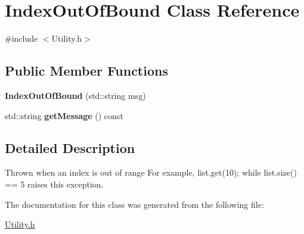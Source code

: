 \hypertarget{class_index_out_of_bound}{
\section{IndexOutOfBound Class Reference}
\label{class_index_out_of_bound}
}


{\ttfamily \#include $<$Utility.h$>$}

\subsection*{Public Member Functions}
\begin{DoxyCompactItemize}
\item 
\hypertarget{class_index_out_of_bound_a139671d1b3d6c7f28bfa56811727f165}{
{\bfseries IndexOutOfBound} (std::string msg)}
\label{class_index_out_of_bound_a139671d1b3d6c7f28bfa56811727f165}

\item 
\hypertarget{class_index_out_of_bound_a8cbbec1f25a774b895a4618e3c416e17}{
std::string {\bfseries getMessage} () const }
\label{class_index_out_of_bound_a8cbbec1f25a774b895a4618e3c416e17}

\end{DoxyCompactItemize}


\subsection{Detailed Description}
Thrown when an index is out of range For example, list.get(10); while list.size() == 5 raises this exception. 

The documentation for this class was generated from the following file:\begin{DoxyCompactItemize}
\item 
\hyperlink{_utility_8h}{Utility.h}\end{DoxyCompactItemize}
